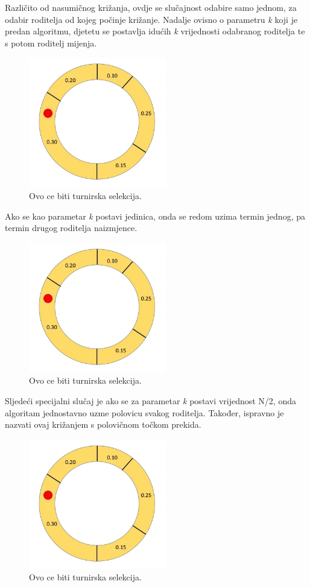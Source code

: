 \documentclass[times, utf8, zavrsni]{fer}
\begin{document}
Različito od nasumičnog križanja, ovdje se slučajnost odabire samo jednom, za odabir roditelja od kojeg počinje križanje. Nadalje ovisno o parametru \emph{k} koji je predan algoritmu, djetetu se postavlja idućih \emph{k} vrijednosti odabranog roditelja te s potom roditelj mijenja.

\begin{figure}[htb]
\centering
\includegraphics[width=6cm]{images/rulet.png}
\caption{Ovo ce biti turnirska selekcija.}
\label{fig:rulet}
\end{figure}

Ako se kao parametar \emph{k} postavi jedinica, onda se redom uzima termin jednog, pa termin drugog roditelja naizmjence.

\begin{figure}[htb]
\centering
\includegraphics[width=6cm]{images/rulet.png}
\caption{Ovo ce biti turnirska selekcija.}
\label{fig:rulet}
\end{figure}

Sljedeći specijalni slučaj je ako se za parametar \emph{k} postavi vrijednost N/2, onda algoritam jednostavno uzme polovicu svakog roditelja. Također, ispravno je nazvati ovaj križanjem s polovičnom točkom prekida.

\begin{figure}[htb]
\centering
\includegraphics[width=6cm]{images/rulet.png}
\caption{Ovo ce biti turnirska selekcija.}
\label{fig:rulet}
\end{figure}
\end{document}
